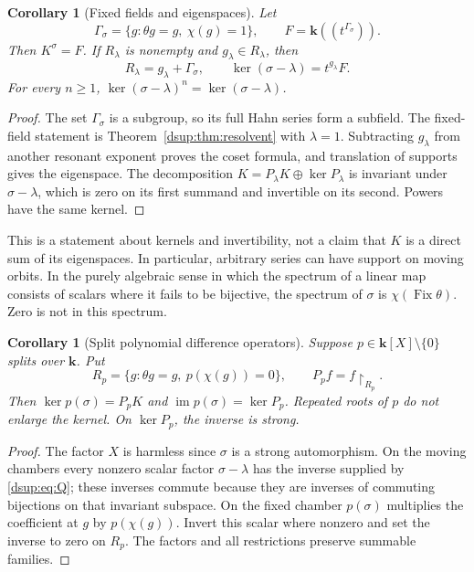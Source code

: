 \documentclass[11pt,oneside]{article}
\numberwithin{equation}{section}
\newtheorem{corollary}[theorem]{Corollary}
\theoremstyle{definition}
\theoremstyle{remark}
\newcommand{\kk}{\mathbf k}
\newcommand{\Fix}{\operatorname{Fix}}
\newcommand{\im}{\operatorname{im}}
\newcommand{\restr}[2]{#1\!\upharpoonright_{#2}}
\begin{document}
\begin{corollary}[Fixed fields and eigenspaces]\label{dsup:cor:fixed}
Let
\[
 \Gamma_\sigma=\{g:\theta g=g,\ \chi(g)=1\},\qquad
 F=\kk((t^{\Gamma_\sigma})).
\]
Then $K^\sigma=F$. If $R_\lambda$ is nonempty and $g_\lambda\in R_\lambda$,
then
\[
 R_\lambda=g_\lambda+\Gamma_\sigma,\qquad
 \ker(\sigma-\lambda)=t^{g_\lambda}F.
\]
For every $n\ge1$,
$\ker(\sigma-\lambda)^n=\ker(\sigma-\lambda)$.
\end{corollary}
\begin{proof}
The set $\Gamma_\sigma$ is a subgroup, so its full Hahn series form a
subfield. The fixed-field statement is Theorem~\ref{dsup:thm:resolvent} with
$\lambda=1$. Subtracting $g_\lambda$ from another resonant exponent proves
the coset formula, and translation of supports gives the eigenspace.
The decomposition $K=P_\lambda K\oplus\ker P_\lambda$ is invariant under
$\sigma-\lambda$, which is zero on its first summand and invertible on
its second. Powers have the same kernel.
\end{proof}

This is a statement about kernels and invertibility, not a claim that
$K$ is a direct sum of its eigenspaces. In particular, arbitrary series
can have support on moving orbits. In the purely algebraic sense in which
the spectrum of a linear map consists of scalars where it fails to be
bijective, the spectrum of $\sigma$ is
$\chi(\Fix\theta)$. Zero is not in this spectrum.

\begin{corollary}[Split polynomial difference operators]\label{dsup:cor:poly}
Suppose $p\in\kk[X]\setminus\{0\}$ splits over $\kk$. Put
\[
 R_p=\{g:\theta g=g,\ p(\chi(g))=0\},\qquad P_pf=\restr f{R_p}.
\]
Then $\ker p(\sigma)=P_pK$ and $\im p(\sigma)=\ker P_p$.
Repeated roots of $p$ do not enlarge the kernel. On $\ker P_p$, the inverse
is strong.
\end{corollary}
\begin{proof}
The factor $X$ is harmless since $\sigma$ is a strong automorphism.
On the moving chambers every nonzero scalar factor $\sigma-\lambda$ has
the inverse supplied by \eqref{dsup:eq:Q}; these inverses commute because they
are inverses of commuting bijections on that invariant subspace.
On the fixed chamber $p(\sigma)$ multiplies the coefficient at $g$ by
$p(\chi(g))$. Invert this scalar where nonzero and set the inverse to zero
on $R_p$. The factors and all restrictions preserve summable families.
\end{proof}
\end{document}
